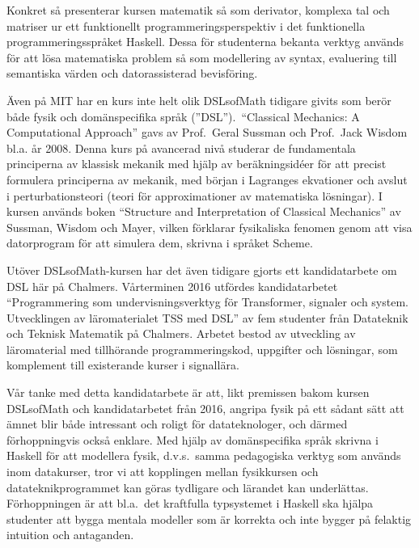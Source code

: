 \begin{binge}
Konkret så presenterar kursen matematik så som derivator, komplexa
tal och matriser ur ett funktionellt programmeringsperspektiv i det funktionella programmeringsspråket  %
Haskell. Dessa för studenterna bekanta verktyg används för att lösa
matematiska problem så som modellering av syntax, evaluering till
semantiska värden och datorassisterad bevisföring.

Även på MIT har en kurs inte helt olik DSLsofMath tidigare givits som berör både
fysik och domänspecifika språk (''DSL'').\ ``Classical Mechanics: A Computational Approach'' gavs av
Prof.\ Geral Sussman och Prof.\ Jack Wisdom bl.a. år
2008.\cite{classical-mechanics-course-mit-2008}
Denna kurs på avancerad nivå studerar de fundamentala principerna av klassisk
mekanik med hjälp av beräkningsidéer för att precist formulera principerna av
mekanik, med början i Lagranges ekvationer och avslut i
perturbationsteori (teori för approximationer av matematiska lösningar). I kursen används boken ``Structure and %
Interpretation of Classical Mechanics'' av Sussman, Wisdom och Mayer,
vilken förklarar fysikaliska fenomen genom att visa datorprogram för att
simulera dem, skrivna i språket Scheme.\cite{SICM}

Utöver DSLsofMath-kursen har det även tidigare gjorts ett kandidatarbete om DSL 
här på Chalmers. Vårterminen 2016 utfördes kandidatarbetet
``Programmering som undervisningsverktyg för Transformer, signaler och
system. Utvecklingen av läromaterialet TSS med DSL'' av fem studenter
från Datateknik och Teknisk Matematik på Chalmers. Arbetet bestod av
utveckling av läromaterial med tillhörande programmeringskod,
uppgifter och lösningar, som komplement till existerande kurser i
signallära.\cite{kandidat2016}

Vår tanke med detta kandidatarbete är att, likt premissen bakom kursen DSLsofMath
och kandidatarbetet från 2016, angripa fysik på ett sådant sätt att ämnet blir både
intressant och roligt för datateknologer, och därmed förhoppningvis
också enklare. Med hjälp av domänspecifika språk skrivna i Haskell för att
modellera fysik, d.v.s.\ samma pedagogiska verktyg som används inom           %
datakurser, tror vi att kopplingen mellan fysikkursen och
datateknikprogrammet kan göras tydligare och lärandet kan underlättas.
Förhoppningen är att bl.a.\ det kraftfulla typsystemet i Haskell ska
hjälpa studenter att bygga mentala modeller som är korrekta och inte
bygger på felaktig intuition och antaganden.


\end{binge}
